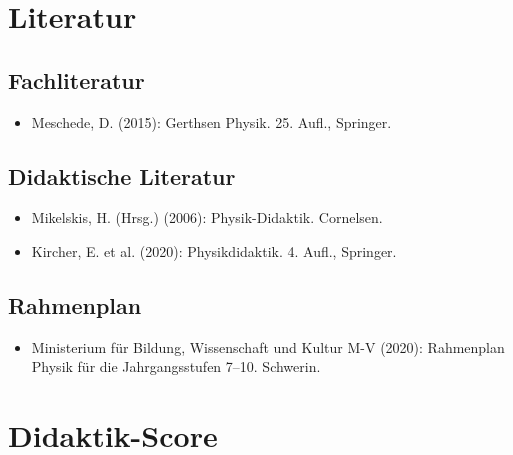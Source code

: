 \documentclass[11pt,a4paper]{article}
\begin{document}
\section{Literatur}

\subsection{Fachliteratur}
\begin{itemize}
    \item Meschede, D. (2015): Gerthsen Physik. 25. Aufl., Springer.
\end{itemize}

\subsection{Didaktische Literatur}
\begin{itemize}
    \item Mikelskis, H. (Hrsg.) (2006): Physik-Didaktik. Cornelsen.
    \item Kircher, E. et al. (2020): Physikdidaktik. 4. Aufl., Springer.
\end{itemize}

\subsection{Rahmenplan}
\begin{itemize}
    \item Ministerium für Bildung, Wissenschaft und Kultur M-V (2020): Rahmenplan Physik für die Jahrgangsstufen 7--10. Schwerin.
\end{itemize}

\newpage
\section{Didaktik-Score}
\end{document}
